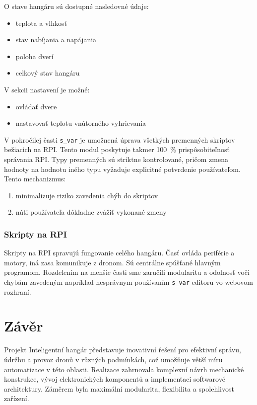 \documentclass[a4paper]{article}
\begin{document}
    \noindent
    O stave hangáru sú dostupné nasledovné údaje:
    \begin{itemize}[noitemsep, topsep=0pt]
        \item teplota a vlhkosť
        \item stav nabíjania a napájania
        \item poloha dverí
        \item celkový stav hangáru
    \end{itemize}
    \vspace{.3cm}

    \noindent
    V sekcii nastavení je možné:
    \begin{itemize}[noitemsep, topsep=0pt]
        \item ovládať dvere
        \item nastavovať teplotu vnútorného vyhrievania
    \end{itemize}
    \vspace{.3cm}
    
    \noindent
    V pokročilej časti \texttt{s\_var} je umožnená úprava všetkých premenných skriptov bežiacich na RPI. Tento modul poskytuje takmer 100~\% prispôsobiteľnosť správania RPI. Typy premenných sú striktne kontrolované, pričom zmena hodnoty na hodnotu iného typu vyžaduje explicitné potvrdenie používateľom. Tento mechanizmus:
    \begin{enumerate}
        \item minimalizuje riziko zavedenia chýb do skriptov
        \item núti používateľa dôkladne zvážiť vykonané zmeny
    \end{enumerate}

    \subsubsection{Skripty na RPI}
    Skripty na RPI spravujú fungovanie celého hangáru. Časť ovláda periférie a motory, iná zasa komunikuje z dronom. Sú centrálne spúšťané hlavným programom. Rozdelením na menšie časti sme zaručili modularitu a odolnosť voči chybám zavedeným napríklad nesprávnym používaním \texttt{s\_var} editoru vo webovom rozhraní.

\section{Závěr}
    Projekt Inteligentní hangár představuje inovativní řešení pro efektivní správu, údržbu a provoz dronů v různých podmínkách, což umožňuje větší míru automatizace v této oblasti. Realizace zahrnovala komplexní návrh mechanické konstrukce, vývoj elektronických komponentů a implementaci softwarové architektury. Záměrem byla maximální modularita, flexibilita a spolehlivost zařízení.\\
\end{document}
